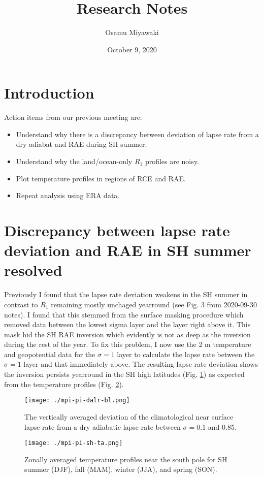 \documentclass[11pt]{article}
\author{Osamu Miyawaki}
\date{October 9, 2020}
\title{Research Notes}
\begin{document}
\maketitle

\section{Introduction}
\label{sec:org97c430e}
Action items from our previous meeting are:
\begin{itemize}
\item Understand why there is a discrepancy between deviation of lapse rate from a dry adiabat and RAE during SH summer.
\item Understand why the land/ocean-only \(R_1\) profiles are noisy.
\item Plot temperature profiles in regions of RCE and RAE.
\item Repeat analysis using ERA data.
\end{itemize}

\section{Discrepancy between lapse rate deviation and RAE in SH summer resolved}
\label{sec:orga921d52}
Previously I found that the lapse rate deviation weakens in the SH summer in contrast to \(R_1\) remaining mostly unchaged yearround (see Fig. 3 from 2020-09-30 notes). I found that this stemmed from the surface masking procedure which removed data between the lowest sigma layer and the layer right above it. This mask hid the SH RAE inversion which evidently is not as deep as the inversion during the rest of the year. To fix this problem, I now use the 2 m temperature and geopotential data for the \(\sigma=1\) layer to calculate the lapse rate between the \(\sigma=1\) layer and that immediately above. The resulting lapse rate deviation shows the inversion persists yearround in the SH high latitudes (Fig. \ref{fig:org5904b47}) as expected from the temperature profiles (Fig. \ref{fig:orgd0a618f}).

\begin{figure}[htbp]
\centering
\texttt{[image: ./mpi-pi-dalr-bl.png]}
\caption{\label{fig:org5904b47}The vertically averaged deviation of the climatological near surface lapse rate from a dry adiabatic lapse rate between \(\sigma=0.1\) and 0.85.}
\end{figure}

\begin{figure}[htbp]
\centering
\texttt{[image: ./mpi-pi-sh-ta.png]}
\caption{\label{fig:orgd0a618f}Zonally averaged temperature profiles near the south pole for SH summer (DJF), fall (MAM), winter (JJA), and spring (SON).}
\end{figure}
\end{document}
